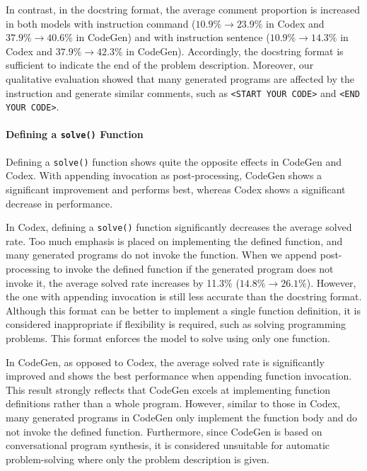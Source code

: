 \documentclass{article}
\begin{document}
In contrast, in the docstring format, the average comment proportion is increased in both models with instruction command ($10.9\% \rightarrow 23.9\%$ in Codex and $37.9\% \rightarrow 40.6\%$ in CodeGen) and with instruction sentence ($10.9\% \rightarrow 14.3\%$ in Codex and $37.9\% \rightarrow 42.3\%$ in CodeGen).
Accordingly, the docstring format is sufficient to indicate the end of the problem description.
Moreover, our qualitative evaluation showed that many generated programs are affected by the instruction and generate similar comments, such as \texttt{\textless START YOUR CODE\textgreater} and \texttt{\textless END YOUR CODE\textgreater}.





\paragraph{Defining a \texttt{solve()} Function}

Defining a \texttt{solve()} function shows quite the opposite effects in CodeGen and Codex.
With appending invocation as post-processing, CodeGen shows a significant improvement and performs best, whereas Codex shows a significant decrease in performance.

In Codex, defining a \texttt{solve()} function significantly decreases the average solved rate.
Too much emphasis is placed on implementing the defined function, and many generated programs do not invoke the function.
When we append post-processing to invoke the defined function if the generated program does not invoke it, the average solved rate increases by 11.3\% ($14.8\% \rightarrow 26.1\%$).
However, the one with appending invocation is still less accurate than the docstring format.
Although this format can be better to implement a single function definition, it is considered inappropriate if flexibility is required, such as solving programming problems.
This format enforces the model to solve using only one function.

In CodeGen, as opposed to Codex, the average solved rate is significantly improved and shows the best performance when appending function invocation.
This result strongly reflects that CodeGen excels at implementing function definitions rather than a whole program.
However, similar to those in Codex, many generated programs in CodeGen only implement the function body and do not invoke the defined function.
Furthermore, since CodeGen is based on conversational program synthesis, it is considered unsuitable for automatic problem-solving where only the problem description is given. 
\end{document}
